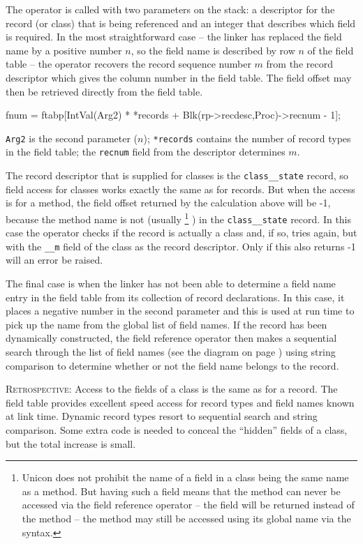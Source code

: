 The operator is called with two parameters on the stack: a descriptor for
the record (or class) that is being referenced and an integer that describes
which field is required.
In the most straightforward case -- the linker has replaced the field name
by a positive number $n$, so the field name is described by row $n$ of the
field table -- the operator recovers the record sequence number $m$ from the
record descriptor which gives the column number in the field table.  The
field offset may then be retrieved directly from the field table.
\begin{iconcode}
  fnum = ftabp[IntVal(Arg2) * *records + Blk(rp->recdesc,Proc)->recnum - 1];
\end{iconcode}
\texttt{Arg2} is the second parameter ($n$); \texttt{*records} contains the
number of record types in the field table; the \texttt{recnum} field from the
descriptor determines $m$.

The record descriptor that is supplied for classes is the
\texttt{class\_\_state} record, so field access for classes works exactly the
same as for records. But when the access is for a method, the field offset
returned by the calculation above will be -1, because the method name is not
(usually%
\footnote{Unicon does not prohibit the name of a field in a class being the
same name as a method. But having such a field means that the method can
never be accessed via the field reference operator -- the field will be
returned instead of the method -- the method may still be accessed using its
global name via the  syntax.
}%
) in the \texttt{class\_\_state} record. In this case the operator checks if
the record is actually a class and, if so, tries again, but with the
\texttt{\_\_m} field of the class as the record descriptor. Only if this
also returns -1 will an error be raised.

The final case is when the linker has not been able to determine a field
name entry in the field table from its collection of record declarations. In
this case, it places a negative number in the second parameter and this is
used at run time to pick up the name from the global list of field names. If
the record has been dynamically constructed, the field reference operator
then makes a sequential search through the list of field names (see the
diagram on page \pageref{FullComplexRecord}) using string comparison to
determine whether or not the field name belongs to the record.

\bigskip\bigskip
\textsc{Retrospective}:
Access to the fields of a class is the same as for a record. The field table
provides excellent speed access for record types and field names known at
link time. Dynamic record types resort to sequential search and string
comparison.  Some extra code is needed to conceal the ``hidden'' fields of a
class, but the total increase is small.

